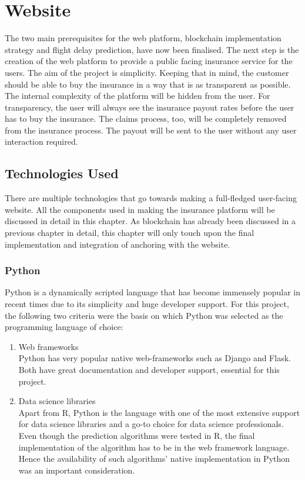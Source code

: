 \chapter{Website}

The two main prerequisites for the web platform, blockchain implementation strategy and flight delay prediction, have now been finalised. The next step is the creation of the web platform to provide a public facing insurance service for the users. The aim of the project is simplicity. Keeping that in mind, the customer should be able to buy the insurance in a way that is as transparent as possible. The internal complexity of the platform will be hidden from the user. For transparency, the user will always see the insurance payout rates before the user has to buy the insurance. The claims process, too, will be completely removed from the insurance process. The payout will be sent to the user without any user interaction required.

\section{Technologies Used}
There are multiple technologies that go towards making a full-fledged user-facing website. All the components used in making the insurance platform will be discussed in detail in this chapter. As blockchain has already been discussed in a previous chapter in detail, this chapter will only touch upon the final implementation and integration of anchoring with the website.

\subsection{Python}
Python is a dynamically scripted language that has become immensely popular in recent times due to its simplicity and huge developer support. For this project, the following two criteria were the basis on which Python was selected as the programming language of choice:
\begin{enumerate}
    \item Web frameworks
    \\Python has very popular native web-frameworks such as Django and Flask. Both have great documentation and developer support, essential for this project. 
    \item Data science libraries
    \\ Apart from R, Python is the language with one of the most extensive support for data science libraries and a go-to choice for data science professionals. Even though the prediction algorithms were tested in R, the final implementation of the algorithm has to be in the web framework language. Hence the availability of such algorithms' native implementation in Python was an important consideration.
\end{enumerate}

